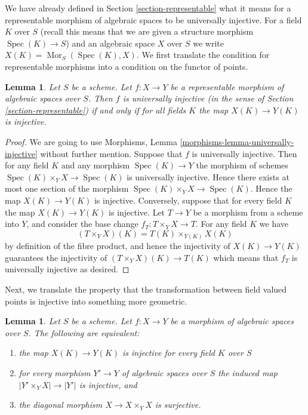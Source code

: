 \documentclass{stacks-project}
\theoremstyle{plain}
\newtheorem{lemma}[subsection]{Lemma}
\theoremstyle{definition}
\theoremstyle{remark}
\numberwithin{equation}{subsection}
\def\Spec{\mathop{\mathrm{Spec}}}
\def\Mor{\mathop{\mathrm{Mor}}\nolimits}
\begin{document}
\noindent
We have already defined in Section \ref{section-representable}
what it means for a representable morphism of algebraic spaces
to be universally injective. For a field $K$ over $S$ (recall this means that
we are given a structure morphism $\Spec(K) \to S$) and an
algebraic space $X$ over $S$ we write
$X(K) = \Mor_S(\Spec(K), X)$. We first translate the
condition for representable morphisms into a condition on the functor
of points.

\begin{lemma}
\label{lemma-universally-injective-representable}
Let $S$ be a scheme. Let $f : X \to Y$ be a representable
morphism of algebraic spaces over $S$. Then $f$ is universally injective
(in the sense of Section \ref{section-representable})
if and only if for all fields $K$ the map $X(K) \to Y(K)$ is injective.
\end{lemma}

\begin{proof}
We are going to use
Morphisms, Lemma \ref{morphisms-lemma-universally-injective}
without further mention.
Suppose that $f$ is universally injective. Then for any field $K$ and any
morphism $\Spec(K) \to Y$ the morphism of schemes
$\Spec(K) \times_Y X \to \Spec(K)$ is universally injective.
Hence there exists at most one section of the morphism
$\Spec(K) \times_Y X \to \Spec(K)$. Hence the map
$X(K) \to Y(K)$ is injective. Conversely, suppose that for every field $K$
the map $X(K) \to Y(K)$ is injective. Let $T \to Y$ be a morphism from a
scheme into $Y$, and consider the base change $f_T : T \times_Y X \to T$.
For any field $K$ we have
$$
(T \times_Y X)(K) = T(K) \times_{Y(K)} X(K)
$$
by definition of the fibre product, and hence the injectivity of
$X(K) \to Y(K)$ guarantees the injectivity of
$(T \times_Y X)(K) \to T(K)$ which means that $f_T$ is universally injective
as desired.
\end{proof}

\noindent
Next, we translate the property that the transformation between field valued
points is injective into something more geometric.

\begin{lemma}
\label{lemma-universally-injective}
Let $S$ be a scheme.
Let $f : X \to Y$ be a morphism of algebraic spaces over $S$.
The following are equivalent:
\begin{enumerate}
\item the map $X(K) \to Y(K)$ is injective for every field $K$ over $S$
\item for every morphism $Y' \to Y$ of algebraic spaces over $S$
the induced map $|Y' \times_Y X| \to |Y'|$ is injective, and
\item the diagonal morphism $X \to X \times_Y X$ is surjective.
\end{enumerate}
\end{lemma}
\end{document}
